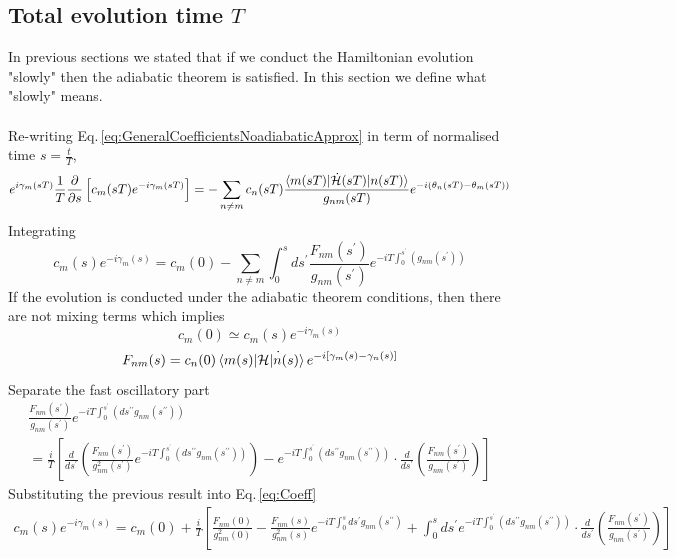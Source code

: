 \subsection{Total evolution time $T$}
In previous sections we stated that if we conduct the Hamiltonian evolution "slowly" then the adiabatic theorem is satisfied. In this section we define what "slowly" means. \\\\
Re-writing Eq.\,\eqref{eq:GeneralCoefficientsNoadiabaticApprox} in term of normalised time $s = \frac{t}{T}$,
\begin{equation}
    e^{i\gamma_{m}(sT)}\frac{1}{T}\frac{\partial }{\partial s}\left[c_{m}(sT)e^{-i\gamma_{m}(sT)}\right] = -\sum_{n\neq m} c_{n}(sT) \frac{\braket{m(sT)|\dot{\mathcal{H}}(sT)|n(sT)}}{g_{nm}(sT)}e^{-i\left(\theta_{n}(sT) - \theta_{m}(sT)\right)}
\end{equation}
Integrating
\begin{equation}
\label{eq:Coeff}
    c_{m}(s)e^{-i\gamma_{m}(s)} = c_{m}(0) - \sum_{n\neq m}\int_{0}^{s} ds^{\prime}\frac{F_{nm}(s^{\prime})}{g_{nm}(s^{\prime})}e^{-iT\int_{0}^{s^{\prime}}\left(g_{nm}(s^{\prime})\right)}
\end{equation}
If the evolution is conducted under the adiabatic theorem conditions, then there are not mixing terms which implies
\begin{equation}
    c_{m}(0) \simeq c_{m}(s)e^{-i\gamma_{m}(s)}
\end{equation}
\begin{equation}
    F_{nm}(s) = c_{n}(0)\braket{m(s)|\dot{\mathcal{H}|n(s)}} e^{-i\left[\gamma_{m}(s) - \gamma_{n}(s)\right]}
\end{equation}
Separate the fast oscillatory part
\begin{align}
\frac{F_{nm}(s^{\prime})}{g_{nm}(s^{\prime})} e^{-iT\int_{0}^{s^{\prime}}\left(ds^{\prime \prime}g_{nm}(s^{\prime\prime}) \right)} \\
= \frac{i}{T}\left[\frac{d}{ds^{\prime}}\left(\frac{F_{nm}(s^{\prime})}{g^{2}_{nm}(s^{\prime})}e^{-iT\int_{0}^{s^{\prime}}\left(ds^{\prime \prime}g_{nm}(s^{\prime\prime}) \right)}\right) - e^{-iT\int_{0}^{s^{\prime}}\left(ds^{\prime \prime}g_{nm}(s^{\prime\prime}) \right)} \cdot \frac{d}{ds^{\prime}}\left(\frac{F_{nm}(s^{\prime})}{g_{nm}(s^{\prime})}\right)\right] 
 \end{align}
 Substituting the previous result into Eq.\,\eqref{eq:Coeff}
 \begin{align}
     c_{m}(s)e^{-i\gamma_{m}(s)} = c_{m}(0) + \frac{i}{T}\left[\frac{F_{nm}(0)}{g^{2}_{nm}(0)} - \frac{F_{nm}(s)}{g^{2}_{nm}(s)}e^{-iT\int_{0}^{s}ds^{\prime}g_{nm}(s^{\prime \prime})} + \int_{0}^{s}ds^{\prime} e^{-iT\int_{0}^{s^{\prime}}\left(ds^{\prime \prime}g_{nm}(s^{\prime\prime}) \right)} \cdot \frac{d}{ds^{\prime}}\left(\frac{F_{nm}(s^{\prime})}{g_{nm}(s^{\prime})}\right)\right] 
 \end{align}

